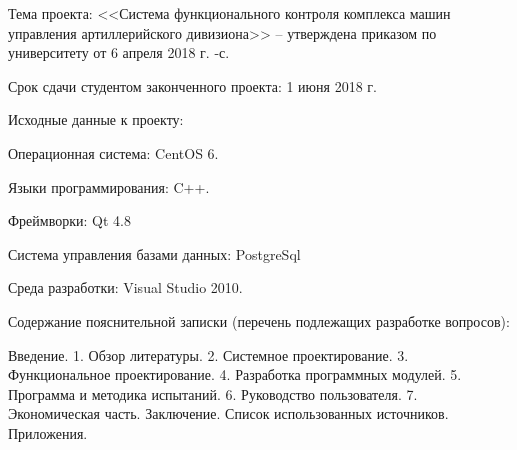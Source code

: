 {    %
	    \begin{legal}[leftmargin=*,label={\arabic*}]
	    \item Тема проекта: <<Система функционального контроля комплекса машин управления артиллерийского дивизиона>> --
		    утверждена приказом по университету от 6 апреля 2018 г. -с.

		    \vspace{1em}

	    \item Срок сдачи студентом законченного проекта: 1 июня 2018 г.

		    \vspace{1em}

	    \item Исходные данные к проекту:

		    \begin{legal}[label*={.\arabic*}]
		    \item Операционная система: CentOS 6.
		    \item Языки программирования: C++.
		    \item Фреймворки: Qt 4.8
		    \item Система управления базами данных: PostgreSql
		    \item Среда разработки: Visual Studio 2010.
		    \end{legal}

		    \vspace{1em}

	    \item Содержание пояснительной записки (перечень подлежащих разработке вопросов):

		    Введение.
		    1. Обзор литературы.
		    2. Системное проектирование.
		    3. Функциональное проектирование.
		    4. Разработка программных модулей.
		    5. Программа и методика испытаний.
		    6. Руководство пользователя.
		    7. Экономическая часть.
		    Заключение.
		    Список использованных источников.
		    Приложения.

		    \vspace{1em}


\end{legal}}
